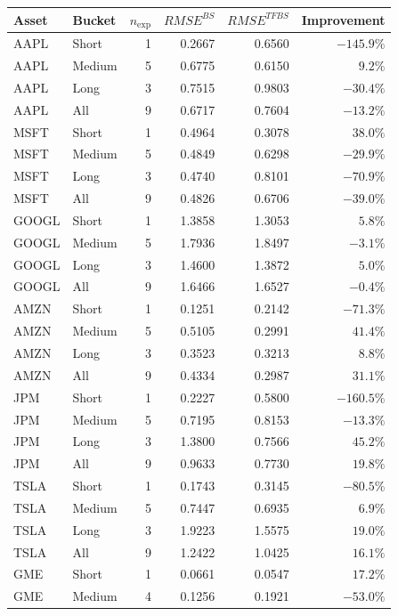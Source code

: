 \documentclass[11pt,a4paper]{report}
\begin{document}
\begin{table}[htbp]
\centering
\scriptsize
\begin{tabular}{llrrrr}
\toprule
Asset & Bucket & $n_{\mathrm{exp}}$ & $RMSE^{BS}$ & $RMSE^{TFBS}$ & Improvement \\
\midrule
AAPL & Short  & 1 & 0.2667 & 0.6560 & $-145.9\%$ \\
AAPL & Medium & 5 & 0.6775 & 0.6150 & $9.2\%$ \\
AAPL & Long   & 3 & 0.7515 & 0.9803 & $-30.4\%$ \\
AAPL & All    & 9 & 0.6717 & 0.7604 & $-13.2\%$ \\
\midrule
MSFT & Short  & 1 & 0.4964 & 0.3078 & $38.0\%$ \\
MSFT & Medium & 5 & 0.4849 & 0.6298 & $-29.9\%$ \\
MSFT & Long   & 3 & 0.4740 & 0.8101 & $-70.9\%$ \\
MSFT & All    & 9 & 0.4826 & 0.6706 & $-39.0\%$ \\
\midrule
GOOGL & Short  & 1 & 1.3858 & 1.3053 & $5.8\%$ \\
GOOGL & Medium & 5 & 1.7936 & 1.8497 & $-3.1\%$ \\
GOOGL & Long   & 3 & 1.4600 & 1.3872 & $5.0\%$ \\
GOOGL & All    & 9 & 1.6466 & 1.6527 & $-0.4\%$ \\
\midrule
AMZN & Short  & 1 & 0.1251 & 0.2142 & $-71.3\%$ \\
AMZN & Medium & 5 & 0.5105 & 0.2991 & $41.4\%$ \\
AMZN & Long   & 3 & 0.3523 & 0.3213 & $8.8\%$ \\
AMZN & All    & 9 & 0.4334 & 0.2987 & $31.1\%$ \\
\midrule
JPM & Short  & 1 & 0.2227 & 0.5800 & $-160.5\%$ \\
JPM & Medium & 5 & 0.7195 & 0.8153 & $-13.3\%$ \\
JPM & Long   & 3 & 1.3800 & 0.7566 & $45.2\%$ \\
JPM & All    & 9 & 0.9633 & 0.7730 & $19.8\%$ \\
\midrule
TSLA & Short  & 1 & 0.1743 & 0.3145 & $-80.5\%$ \\
TSLA & Medium & 5 & 0.7447 & 0.6935 & $6.9\%$ \\
TSLA & Long   & 3 & 1.9223 & 1.5575 & $19.0\%$ \\
TSLA & All    & 9 & 1.2422 & 1.0425 & $16.1\%$ \\
\midrule
GME & Short  & 1 & 0.0661 & 0.0547 & $17.2\%$ \\
GME & Medium & 4 & 0.1256 & 0.1921 & $-53.0\%$ \\

\end{tabular}
\end{table}
\end{document}
